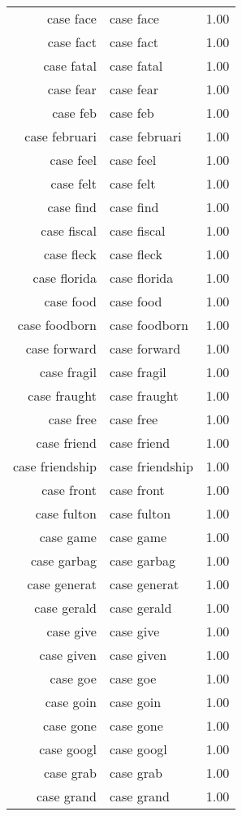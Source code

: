 \begin{table}[ht]
\begin{tabular}{rlr}
  case face & case face & 1.00 \\ 
  case fact & case fact & 1.00 \\ 
  case fatal & case fatal & 1.00 \\ 
  case fear & case fear & 1.00 \\ 
  case feb & case feb & 1.00 \\ 
  case februari & case februari & 1.00 \\ 
  case feel & case feel & 1.00 \\ 
  case felt & case felt & 1.00 \\ 
  case find & case find & 1.00 \\ 
  case fiscal & case fiscal & 1.00 \\ 
  case fleck & case fleck & 1.00 \\ 
  case florida & case florida & 1.00 \\ 
  case food & case food & 1.00 \\ 
  case foodborn & case foodborn & 1.00 \\ 
  case forward & case forward & 1.00 \\ 
  case fragil & case fragil & 1.00 \\ 
  case fraught & case fraught & 1.00 \\ 
  case free & case free & 1.00 \\ 
  case friend & case friend & 1.00 \\ 
  case friendship & case friendship & 1.00 \\ 
  case front & case front & 1.00 \\ 
  case fulton & case fulton & 1.00 \\ 
  case game & case game & 1.00 \\ 
  case garbag & case garbag & 1.00 \\ 
  case generat & case generat & 1.00 \\ 
  case gerald & case gerald & 1.00 \\ 
  case give & case give & 1.00 \\ 
  case given & case given & 1.00 \\ 
  case goe & case goe & 1.00 \\ 
  case goin & case goin & 1.00 \\ 
  case gone & case gone & 1.00 \\ 
  case googl & case googl & 1.00 \\ 
  case grab & case grab & 1.00 \\ 
  case grand & case grand & 1.00 \\ 

\end{tabular}
\end{table}
